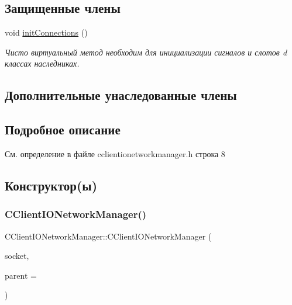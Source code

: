\subsection*{Защищенные члены}
\begin{DoxyCompactItemize}
\item 
void \hyperlink{class_c_client_i_o_network_manager_aeb1564c209ae8b790cf799075cfa6a98}{init\+Connections} ()
\begin{DoxyCompactList}\small\item\em Чисто виртуальный метод необходим для инициализации сигналов и слотов d классах наследниках. \end{DoxyCompactList}\end{DoxyCompactItemize}
\subsection*{Дополнительные унаследованные члены}


\subsection{Подробное описание}


См. определение в файле cclientionetworkmanager.\+h строка 8



\subsection{Конструктор(ы)}
\hypertarget{class_c_client_i_o_network_manager_af9f85db2c4a515cc974038086edc6b9f}{}\label{class_c_client_i_o_network_manager_af9f85db2c4a515cc974038086edc6b9f} 
\subsubsection{\texorpdfstring{C\+Client\+I\+O\+Network\+Manager()}{CClientIONetworkManager()}}
{\footnotesize\ttfamily C\+Client\+I\+O\+Network\+Manager\+::\+C\+Client\+I\+O\+Network\+Manager (\begin{DoxyParamCaption}\item[{Q\+Tcp\+Socket $\ast$}]{socket,  }\item[{Q\+Object $\ast$}]{parent = {} }\end{DoxyParamCaption})\hspace{0.3cm}{\ttfamily [explicit]}}



